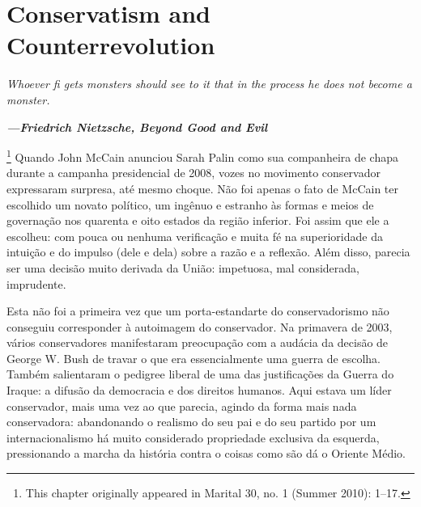  
 \chapter{Conservatism and Counterrevolution}  

 \label{Conservatism and Counterrevolution}  
 
 
\par
 
 
 \textit{	Whoever ﬁ gets monsters should see to it that in the process he does not become a monster.}  

 
\par
 
 
 
\par
 

 \textbf{\textit{	—Friedrich Nietzsche, Beyond Good and Evil} }  

 
\par
 

 \footnote{This chapter originally appeared in Marital 30, no. {\color{blue} 1 } (Summer 2010): 1–17.}  
Quando John McCain anunciou Sarah Palin como sua companheira de chapa durante a campanha presidencial de 2008, vozes no movimento conservador expressaram surpresa, até mesmo choque. Não foi apenas o fato de McCain ter escolhido um novato político, um ingênuo e estranho às formas e meios de governação nos quarenta e oito estados da região inferior. Foi assim que ele a escolheu: com pouca ou nenhuma verificação e muita fé na superioridade da intuição e do impulso (dele e dela) sobre a razão e a reflexão. Além disso, parecia ser uma decisão muito derivada da União: impetuosa, mal considerada, imprudente.
 
\par
 
Esta não foi a primeira vez que um porta-estandarte do conservadorismo não conseguiu corresponder à autoimagem do conservador. Na primavera de 2003, vários conservadores manifestaram preocupação com a audácia da decisão de George W. Bush de travar o que era essencialmente uma guerra de escolha. Também salientaram o pedigree liberal de uma das justificações da Guerra do Iraque: a difusão da democracia e dos direitos humanos. Aqui estava um líder conservador, mais uma vez ao que parecia, agindo da forma mais nada conservadora: abandonando o realismo do seu pai e do seu partido por um internacionalismo há muito considerado propriedade exclusiva da esquerda, pressionando a marcha da história contra o coisas como são dá o Oriente Médio.
 
